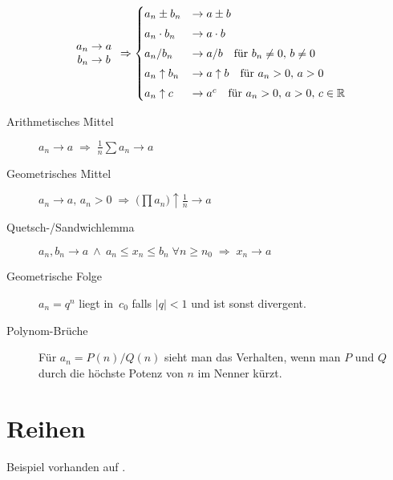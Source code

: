 \nopagebreak
\[
\begin{array}{c}
	a_n\to a \\
	b_n\to b
\end{array}
\Rightarrow
\begin{cases}
	a_n\pm b_n       & \to a\pm b                                                  \\[0.3333em]
	a_n\cdot b_n     & \to a\cdot b                                                \\[0.3333em]
	a_n / b_n        & \to a/b \quad \hbox{für $b_n \neq 0, \, b \neq 0$}          \\[0.3333em]
	a_n \uparrow b_n & \to a \uparrow b \quad \hbox{für $a_n>0, \, a>0$}           \\[0.3333em]
	a_n \uparrow c   & \to a^c \quad \hbox{für $a_n>0, \, a>0, \, c\in\mathbb{R}$}
\end{cases}
\]

\begin{description}
  \item [Arithmetisches Mittel] 
	$a_n \to a \;\Rightarrow\; \frac{1}{n}\sum a_n \rightarrow a$
  \item [Geometrisches Mittel] 
	$a_n \to a, \, a_n>0 \;\Rightarrow\; \bigl( \prod a_n \bigr) \uparrow \frac{1}{n} \to a$
  \item [Quetsch-/Sandwichlemma] 
	$a_n, b_n \to a\: \land \: a_n \leq x_n \leq b_n \; \forall n\geq n_0 \; \Rightarrow \; x_n\to a$
  \item [Geometrische Folge] 
	$a_n = q^n$ liegt in~$c_0$ falls $\lvert q \rvert<1$ und ist sonst divergent.
  \item [Polynom-Brüche]
	Für $a_n = P(n)/Q(n)$ sieht man das Verhalten, wenn man $P$ und $Q$ durch die höchste Potenz von $n$ im Nenner kürzt.
\end{description}



\section{Reihen}

\CheckedBox{} Beispiel vorhanden auf .

